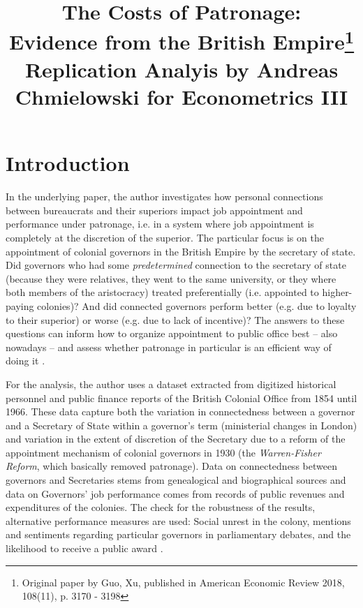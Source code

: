 \documentclass[a4paper]{article}\usepackage[]{graphicx}\usepackage[]{color}
\title{The Costs of Patronage:\\ Evidence from the British Empire\thanks{Original paper by Guo, Xu, published in American Economic Review 2018, 108(11), p. 3170 - 3198} \\ \vskip 0.4cm \normalsize Replication Analyis by Andreas Chmielowski for Econometrics III}
\date{\vspace{-5ex}}
\begin{document}


\maketitle

\section{Introduction}
\hspace*{5mm} In the underlying paper, the author investigates how personal connections between bureaucrats and their superiors impact job appointment and performance under patronage, i.e. in a system where job appointment is completely at the discretion of the superior. The particular focus is on the appointment of colonial governors in the British Empire by the secretary of state. Did governors who had some \textit{predetermined} connection to the secretary of state (because they were relatives, they went to the same university, or they where both members of the aristocracy) treated preferentially (i.e. appointed to higher-paying colonies)? And did connected governors perform better (e.g. due to loyalty to their superior) or worse (e.g. due to lack of incentive)? The answers to these questions can inform how to organize appointment to public office best -- also nowadays -- and assess whether patronage in particular is an efficient way of doing it \parencite{guoxu2018}.

\hspace*{5mm} For the analysis, the author uses a dataset extracted from digitized historical personnel and public finance reports of the British Colonial Office from 1854 until 1966. These data capture both the variation in connectedness between a governor and a Secretary of State within a governor's term (ministerial changes in London) and variation in the extent of discretion of the Secretary due to a reform of the appointment mechanism of colonial governors in 1930 (the \textit{Warren-Fisher Reform}, which basically removed patronage). Data on connectedness between governors and Secretaries stems from genealogical and biographical sources and data on Governors' job performance comes from records of public revenues and expenditures of the colonies. The check for the robustness of the results, alternative performance measures are used: Social unrest in the colony, mentions and sentiments regarding particular governors in parliamentary debates, and the likelihood to receive a public award \parencite[p.3171 ff.]{guoxu2018}. 
\end{document}
